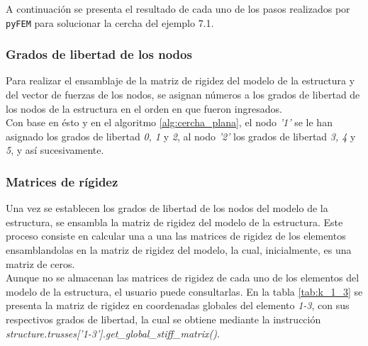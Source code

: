 A continuación se presenta el resultado de cada uno de los pasos realizados por \texttt{pyFEM} para solucionar la cercha del ejemplo 7.1. \\

\subsubsection{Grados de libertad de los nodos}
Para realizar el ensamblaje de la matriz de rigidez del modelo de la estructura y del vector de fuerzas de los nodos, se asignan números a los grados de libertad de los nodos de la estructura en el orden en que fueron ingresados. \\

Con base en ésto y en el algoritmo \ref{alg:cercha_plana}, el nodo \textit{'1'} se le han asignado los grados de libertad \textit{0, 1} y \textit{2}, al nodo \textit{'2'} los grados de libertad \textit{3, 4} y \textit{5}, y así sucesivamente.

\subsubsection{Matrices de rígidez}
Una vez se establecen los grados de libertad de los nodos del modelo de la estructura, se ensambla la matriz de rigidez del modelo de la estructura. Este proceso consiste en calcular una a una las matrices de rigidez de los elementos ensamblandolas en la matriz de rigidez del modelo, la cual, inicialmente, es una matriz de ceros. \\

Aunque no se almacenan las matrices de rigidez de cada uno de los elementos del modelo de la estructura, el usuario puede consultarlas. En la tabla \ref{tab:k_1_3} se presenta la matriz de rigidez en coordenadas globales del elemento \textit{1-3}, con sus respectivos grados de libertad, la cual se obtiene mediante la instrucción \textit{\textit{structure.trusses['1-3'].get\_global\_stiff\_matrix()}}. \\

